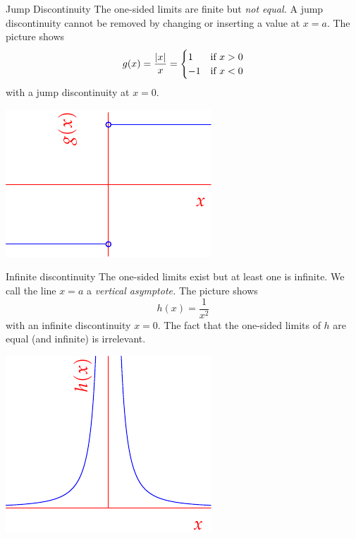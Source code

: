 \begin{description}
\begin{minipage}[t]{0.34\linewidth}
	\end{minipage}
	\smallbreak
	\begin{minipage}[t]{0.65\linewidth}\vspace{0pt}
		\item[Jump Discontinuity] The one-sided limits are finite but \emph{not equal.} A jump discontinuity cannot be removed by changing or inserting a value at $x=a$. The picture shows
		\[
			g(x)=\frac{\left| x\right|}x=
			\begin{cases}
				1&\text{if }x>0\\
				-1&\text{if }x<0
			\end{cases}
		\]
		with a jump discontinuity at $x=0$.
	\end{minipage}
	\hfill
	\begin{minipage}[t]{0.34\linewidth}\vspace{0pt}
		\flushright\includegraphics{discont3}
	\end{minipage}
	\smallbreak
	\begin{minipage}[t]{0.65\linewidth}\vspace{0pt}
		\item[Infinite discontinuity] The one-sided limits exist but at least one is infinite. We call the line $x=a$ a  \emph{vertical asymptote.} The picture shows
		\[
			h(x)=\frac 1{x^2}
		\]
		with an infinite discontinuity $x=0$. The fact that the one-sided limits of $h$ are equal (and infinite) is irrelevant.
	\end{minipage}
	\hfill
	\begin{minipage}[t]{0.34\linewidth}\vspace{0pt}
		\flushright\includegraphics{discont4}

\end{minipage}
\end{description}
